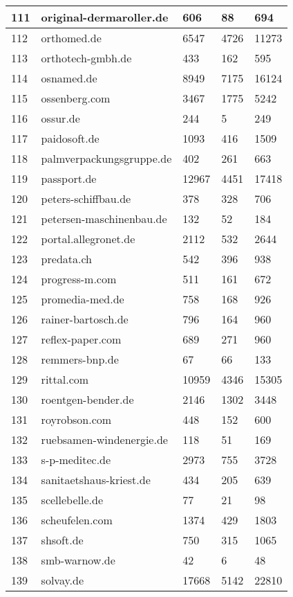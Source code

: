 \begin{longtable}{|m{0.5cm}|m{6cm}|m{2cm}|m{2cm}|m{2cm}|}
	\hline
	111 & original-dermaroller.de & 606 & 88 & 694\\
	\hline
	112 & orthomed.de & 6547 & 4726 & 11273\\
	\hline
	113 & orthotech-gmbh.de & 433 & 162 & 595\\
	\hline
	114 & osnamed.de & 8949 & 7175 & 16124\\
	\hline
	115 & ossenberg.com & 3467 & 1775 & 5242\\
	\hline
	116 & ossur.de & 244 & 5 & 249\\
	\hline
	117 & paidosoft.de & 1093 & 416 & 1509\\
	\hline
	118 & palmverpackungsgruppe.de & 402 & 261 & 663\\
	\hline
	119 & passport.de & 12967 & 4451 & 17418\\
	\hline
	120 & peters-schiffbau.de & 378 & 328 & 706\\
	\hline
	121 & petersen-maschinenbau.de & 132 & 52 & 184\\
	\hline
	122 & portal.allegronet.de & 2112 & 532 & 2644\\
	\hline
	123 & predata.ch & 542 & 396 & 938\\
	\hline
	124 & progress-m.com & 511 & 161 & 672\\
	\hline
	125 & promedia-med.de & 758 & 168 & 926\\
	\hline
	126 & rainer-bartosch.de & 796 & 164 & 960\\
	\hline
	127 & reflex-paper.com & 689 & 271 & 960\\
	\hline
	128 & remmers-bnp.de & 67 & 66 & 133\\
	\hline
	129 & rittal.com & 10959 & 4346 & 15305\\
	\hline
	130 & roentgen-bender.de & 2146 & 1302 & 3448\\
	\hline
	131 & royrobson.com & 448 & 152 & 600\\
	\hline
	132 & ruebsamen-windenergie.de & 118 & 51 & 169\\
	\hline
	133 & s-p-meditec.de & 2973 & 755 & 3728\\
	\hline
	134 & sanitaetshaus-kriest.de & 434 & 205 & 639\\
	\hline
	135 & scellebelle.de & 77 & 21 & 98\\
	\hline
	136 & scheufelen.com & 1374 & 429 & 1803\\
	\hline
	137 & shsoft.de & 750 & 315 & 1065\\
	\hline
	138 & smb-warnow.de & 42 & 6 & 48\\
	\hline
	139 & solvay.de & 17668 & 5142 & 22810\\

\end{longtable}
